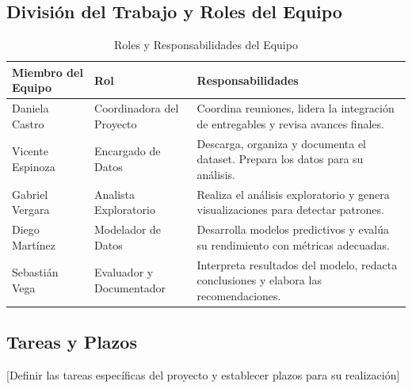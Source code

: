 \documentclass[12pt,letterpaper]{report}
\begin{document}
\subsection{División del Trabajo y Roles del Equipo}

\begin{table}[H]
    \centering
    \begin{tabularx}{\textwidth}{|X|X|X|}
        \hline
        \textbf{Miembro del Equipo} & \textbf{Rol} & \textbf{Responsabilidades} \\
        \hline Daniela Castro
        & Coordinadora del Proyecto & Coordina reuniones, lidera la integración de entregables y revisa avances finales. \\
        \hline Vicente Espinoza
        & Encargado de Datos & Descarga, organiza y documenta el dataset. Prepara los datos para su análisis.\\
        \hline Gabriel Vergara
        & Analista Exploratorio & Realiza el análisis exploratorio y genera visualizaciones para detectar patrones.\\
        \hline Diego Martínez
        & Modelador de Datos & Desarrolla modelos predictivos y evalúa su rendimiento con métricas adecuadas.\\
        \hline Sebastián Vega
        & Evaluador y Documentador & Interpreta resultados del modelo, redacta conclusiones y elabora las recomendaciones.\\
        \hline
    \end{tabularx}
    \caption{Roles y Responsabilidades del Equipo}
\end{table}

\subsection{Tareas y Plazos}
[Definir las tareas específicas del proyecto y establecer plazos para su realización]
\end{document}
